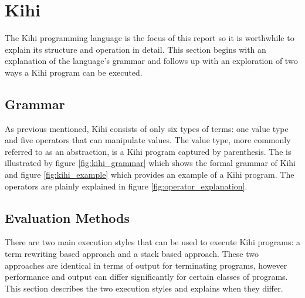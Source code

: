 



\section{Kihi}
The Kihi programming language is the focus of this report so it is worthwhile to explain its structure and operation in detail. This section begins with an explanation of the language's grammar and follows up with an exploration of two ways a Kihi program can be executed.

\subsection{Grammar}
As previous mentioned, Kihi consists of only six types of terms: one value type and five operators that can manipulate values. The value type, more commonly referred to as an abstraction, is a Kihi program captured by parenthesis. The is illustrated by figure \ref{fig:kihi_grammar} which shows the formal grammar of Kihi and figure \ref{fig:kihi_example} which provides an example of a Kihi program. The operators are plainly explained in figure \ref{fig:operator_explanation}.






\subsection{Evaluation Methods}\label{sec:background_evaluation_methods}
There are two main execution styles that can be used to execute Kihi programs: a term rewriting based approach and a stack based approach. These two approaches are identical in terms of output for terminating programs, however performance and output can differ significantly for certain classes of programs. This section describes the two execution styles and explains when they differ.

